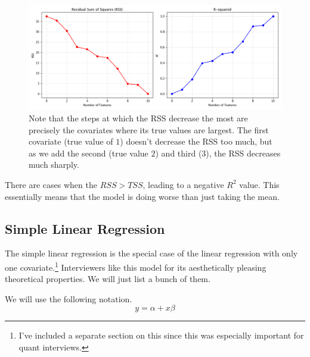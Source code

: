 \begin{example}
    \begin{figure}[H]
      \centering 
      \includegraphics[scale=0.4]{img/rss_r2.png}
      \caption{Note that the steps at which the RSS decrease the most are precisely the covariates where its true values are largest. The first covariate (true value of $1$) doesn't decrease the RSS too much, but as we add the second (true value $2$) and third ($3$), the RSS decreases much sharply. } 
    \end{figure}
  \end{example}

  There are cases when the $RSS > TSS$, leading to a negative $R^2$ value. This essentially means that the model is doing worse than just taking the mean. 

\subsection{Simple Linear Regression}

  The simple linear regression is the special case of the linear regression with only one covariate.\footnote{I've included a separate section on this since this was especially important for quant interviews.} Interviewers like this model for its aesthetically pleasing theoretical properties. We will just list a bunch of them. 


  \begin{definition}
    We will use the following notation. 
    \begin{equation}
      y = \alpha + x \beta
    \end{equation}
  \end{definition}

